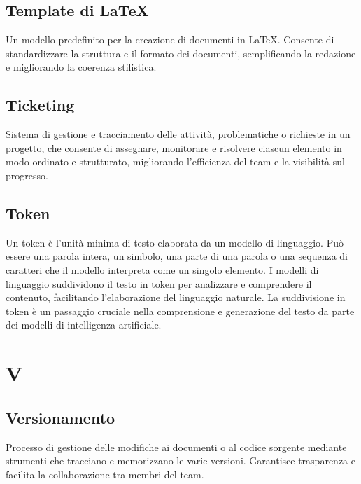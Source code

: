 \documentclass{article}
\begin{document}
\subsection{Template di LaTeX}
Un modello predefinito per la creazione di documenti in LaTeX. Consente di standardizzare la struttura e il formato dei documenti, semplificando la redazione e migliorando la coerenza stilistica.

\subsection{Ticketing}
Sistema di gestione e tracciamento delle attività, problematiche o richieste in un progetto, che consente di assegnare, monitorare e risolvere ciascun elemento in modo ordinato e strutturato, migliorando l'efficienza del team e la visibilità sul progresso.
 
\subsection{Token}
Un token è l'unità minima di testo elaborata da un modello di linguaggio. Può essere una parola intera, un simbolo, una parte di una parola o una sequenza di caratteri che il modello interpreta come un singolo elemento. I modelli di linguaggio suddividono il testo in token per analizzare e comprendere il contenuto, facilitando l'elaborazione del linguaggio naturale. La suddivisione in token è un passaggio cruciale nella comprensione e generazione del testo da parte dei modelli di intelligenza artificiale.
\newpage

\section{V}

\subsection{Versionamento}
Processo di gestione delle modifiche ai documenti o al codice sorgente mediante strumenti che tracciano e memorizzano le varie versioni. Garantisce trasparenza e facilita la collaborazione tra membri del team.
\end{document}
